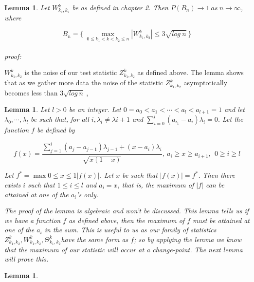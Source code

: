 \documentclass[a4paper, 12pt, notitlepage]{report}
\newtheorem{lemma}[theorem]{Lemma}
\begin{document}
\begin{lemma}

Let \( W^k_{k_1,k_2}\) be as defined in chapter 2. Then $ \displaystyle P(B_n) \to 1\  as\ n \to \infty $, where
 
   \[B_n =\Big \{ \ \max_{0 \leq k_1 < k < k_2 \leq n} | W^k_{k_1, k_2}| \leq 3\sqrt{log\ n}\ \Big  \} \]
\\
proof:

\end{lemma}



 \( W^k_{k_1,k_2}\) is the noise of our test statistic  \( Z^k_{k_1,k_2}\) as defined above. The lemma shows that as we gather more data the noise of the statistic  \( Z^k_{k_1,k_2}\) asymptotically becomes less than \( 3\sqrt{log\ n}\ \), 

\begin{lemma}
%
Let \( l > 0\) be an integer. Let \(0 = a_0 < a_1< \cdots < a_l < a_{l+1} = 1\) and let \(\lambda_0, \cdots , \lambda_l\) be such that, for all \(i, \lambda_i \neq \lambda{i+1}\) and \(\sum^l_{i = 0}(a_{i_1} - a_i)\lambda_i = 0\). Let the function $f$ be defined by

\[f(x) = \frac{\sum^i_{j=1}(a_j - a_{j-1})\lambda_{j-1} + (x - a_i)\lambda_i}{\sqrt{x(1- x)}},\  a_i \geq x \geq a_{i+1},\ \  0\geq i \geq l \]

Let \(f^* = \max{0 \leq x \leq 1}|f(x)|\). Let $x$ be such that $|f(x)| = f^*$. Then there exists $i$ such that \(1 \leq i \leq l\) and \( a_i = x\), that is, the maximum of $|f|$ can be attained at one of the $a_i$'s only. \newline 


The proof of the lemma is algebraic and won't be discussed. This lemma tells us if we have a function $f$ as defined above, then the maximum of $f$ must be attained at one of the \(a_i\) in the sum. This is useful to us as our family of statistics \(Z^k_{k_1, k_2}, W^k_{k_1, k_2}, \Theta^k_{k_1, k_2} \)have the same form as $f$; so by applying the lemma we know that the maximum of our statistic will occur at a change-point. The next lemma will prove this.
\end{lemma}

\begin{lemma}
%

\end{lemma}
\end{document}
